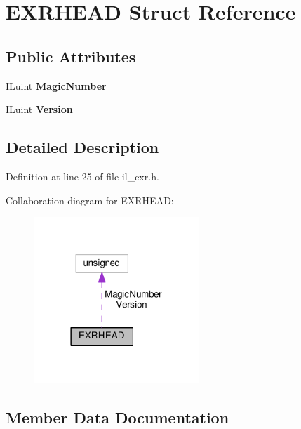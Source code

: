 \hypertarget{structEXRHEAD}{}\section{E\+X\+R\+H\+E\+AD Struct Reference}
\label{structEXRHEAD}
\subsection*{Public Attributes}
\begin{DoxyCompactItemize}
\item 
\mbox{\label{structEXRHEAD_a602e63cc8706a2d619116a45bc4931ab}} 
I\+Luint {\bfseries Magic\+Number}
\item 
\mbox{\label{structEXRHEAD_a0b8d9e6fbf77b0769a73dcc333f14371}} 
I\+Luint {\bfseries Version}
\end{DoxyCompactItemize}


\subsection{Detailed Description}


Definition at line 25 of file il\+\_\+exr.\+h.



Collaboration diagram for E\+X\+R\+H\+E\+AD\+:
\nopagebreak
\begin{figure}[H]
\begin{center}
\leavevmode
\includegraphics[width=177pt]{d2/d86/structEXRHEAD__coll__graph}
\end{center}
\end{figure}


\subsection{Member Data Documentation}
\mbox{\label{structEXRHEAD_a602e63cc8706a2d619116a45bc4931ab}} 
